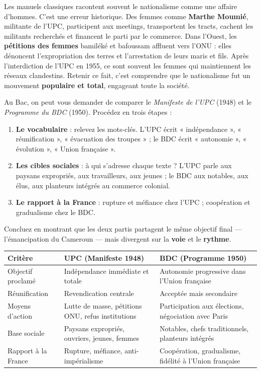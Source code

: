 \documentclass[11pt]{article}
\newcounter{popsec}
\newcounter{popsub}
\newcommand{\courssub}[1]{%
  \stepcounter{popsub}%
  \par\vspace{9pt}\noindent{\popxbold\fontsize{11.5}{13}\selectfont\color{popink}{\color{poporange}\thepopsec.\thepopsub}\hspace{6pt}#1}\par\nopagebreak\vspace{4pt}
}
\begin{document}
\courssub{Complément Bac : le rôle occulté des femmes}

Les manuels classiques racontent souvent le nationalisme comme une affaire d'hommes. C'est une erreur historique. Des femmes comme \textbf{Marthe Moumié}, militante de l'UPC, participent aux meetings, transportent les tracts, cachent les militants recherchés et financent le parti par le commerce. Dans l'Ouest, les \textbf{pétitions des femmes} bamiléké et bafoussam affluent vers l'ONU : elles dénoncent l'expropriation des terres et l'arrestation de leurs maris et fils. Après l'interdiction de l'UPC en 1955, ce sont souvent les femmes qui maintiennent les réseaux clandestins. Retenir ce fait, c'est comprendre que le nationalisme fut un mouvement \textbf{populaire et total}, engageant toute la société.

\begin{methode}
Au Bac, on peut vous demander de comparer le \emph{Manifeste de l'UPC} (1948) et le \emph{Programme du BDC} (1950). Procédez en trois étapes :
\begin{enumerate}
\item \textbf{Le vocabulaire} : relevez les mots-clés. L'UPC écrit « indépendance », « réunification », « évacuation des troupes » ; le BDC écrit « autonomie », « évolution », « Union française ».
\item \textbf{Les cibles sociales} : à qui s'adresse chaque texte ? L'UPC parle aux paysans expropriés, aux travailleurs, aux jeunes ; le BDC aux notables, aux élus, aux planteurs intégrés au commerce colonial.
\item \textbf{Le rapport à la France} : rupture et méfiance chez l'UPC ; coopération et gradualisme chez le BDC.
\end{enumerate}
Concluez en montrant que les deux partis partagent le même objectif final — l'émancipation du Cameroun — mais divergent sur la \textbf{voie} et le \textbf{rythme}.

\begin{center}
\begin{tabularx}{\linewidth}{|l|X|X|}\hline
\rowcolor{popblueL}
\textbf{Critère} & \textbf{UPC (Manifeste 1948)} & \textbf{BDC (Programme 1950)} \\ \hline
Objectif proclamé & Indépendance immédiate et totale & Autonomie progressive dans l'Union française \\ \hline
Réunification & Revendication centrale & Acceptée mais secondaire \\ \hline
Moyens d'action & Lutte de masse, pétitions ONU, refus institutions & Participation aux élections, négociation avec Paris \\ \hline
Base sociale & Paysans expropriés, ouvriers, jeunes, femmes & Notables, chefs traditionnels, planteurs intégrés \\ \hline
Rapport à la France & Rupture, méfiance, anti-impérialisme & Coopération, gradualisme, fidélité à l'Union française \\ \hline
\end{tabularx}
\end{center}
\end{methode}
\end{document}
